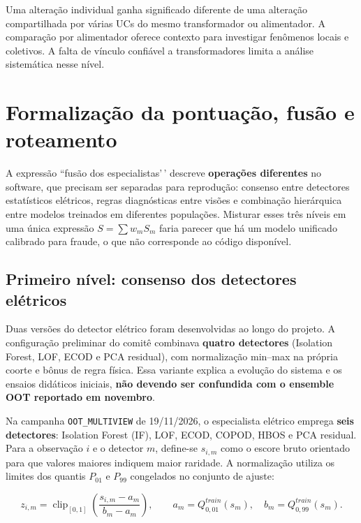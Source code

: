 Uma alteração individual ganha significado diferente de uma alteração compartilhada por várias UCs do mesmo transformador ou alimentador. A comparação por alimentador oferece contexto para investigar fenômenos locais e coletivos. A falta de vínculo confiável a transformadores limita a análise sistemática nesse nível.

\section{Formalização da pontuação, fusão e roteamento}\label{formalizauxe7uxe3o-da-pontuauxe7uxe3o-fusuxe3o-e-roteamento}

A expressão ``fusão dos especialistas'\,' descreve \textbf{operações diferentes} no software, que precisam ser separadas para reprodução: consenso entre detectores estatísticos elétricos, regras diagnósticas entre visões e combinação hierárquica entre modelos treinados em diferentes populações. Misturar esses três níveis em uma única expressão \(S=\sum w_m S_m\) faria parecer que há um modelo unificado calibrado para fraude, o que não corresponde ao código disponível.

\subsection{Primeiro nível: consenso dos detectores elétricos}\label{primeiro-nuxedvel-consenso-dos-detectores-eluxe9tricos}

Duas versões do detector elétrico foram desenvolvidas ao longo do projeto. A configuração preliminar do comitê combinava \textbf{quatro detectores} (Isolation Forest, LOF, ECOD e PCA residual), com normalização min--max na própria coorte e bônus de regra física. Essa variante explica a evolução do sistema e os ensaios didáticos iniciais, \textbf{não devendo ser confundida com o ensemble OOT reportado em novembro}.

Na campanha \texttt{OOT\_MULTIVIEW} de 19/11/2026, o especialista elétrico emprega \textbf{seis detectores}: Isolation Forest (IF), LOF, ECOD, COPOD, HBOS e PCA residual. Para a observação \(i\) e o detector \(m\), define-se \(s_{i,m}\) como o escore bruto orientado para que valores maiores indiquem maior raridade. A normalização utiliza os limites dos quantis $P_{01}$ e $P_{99}$ congelados no conjunto de ajuste:

\[z_{i,m}=\operatorname{clip}_{[0,1]}\!\left(\frac{s_{i,m}-a_m}{b_m-a_m}\right),\qquad a_m=Q_{0,01}^{train}(s_m),\quad b_m=Q_{0,99}^{train}(s_m).\]

